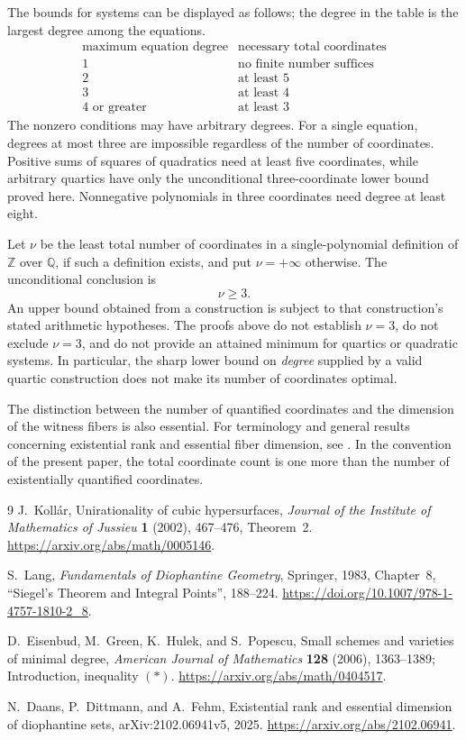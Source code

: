 \documentclass[11pt,a4paper]{article}
\theoremstyle{definition}
\begin{document}
The bounds for systems can be displayed as follows; the degree
in the table is the largest degree among the equations.
\[
\begin{array}{c|c}
\text{maximum equation degree}&\text{necessary total coordinates}\\
\hline
1&\text{no finite number suffices}\\
2&\text{at least }5\\
3&\text{at least }4\\
4\text{ or greater}&\text{at least }3
\end{array}
\]
The nonzero conditions may have arbitrary degrees. For a single
equation, degrees at most three are impossible regardless of the
number of coordinates. Positive sums of squares of quadratics
need at least five coordinates, while arbitrary quartics have
only the unconditional three-coordinate lower bound proved here.
Nonnegative polynomials in three coordinates need degree at
least eight.

Let $\nu$ be the least total number of coordinates in a
single-polynomial definition of $\mathbb Z$ over $\mathbb Q$,
if such a definition exists, and put $\nu=+\infty$ otherwise.
The unconditional conclusion is
\[
                              \nu\ge3.
\]
An upper bound obtained from a construction is subject to that
construction's stated arithmetic hypotheses. The proofs above
do not establish $\nu=3$, do not exclude $\nu=3$, and do not
provide an attained minimum for quartics or quadratic systems.
In particular, the sharp lower bound on \emph{degree} supplied
by a valid quartic construction does not make its number of
coordinates optimal.

The distinction between the number of quantified coordinates
and the dimension of the witness fibers is also essential.
For terminology and general results concerning existential rank
and essential fiber dimension, see \cite{DDF}. In the convention
of the present paper, the total coordinate count is one more
than the number of existentially quantified coordinates.

\begin{thebibliography}{9}
J.~Koll\'ar, Unirationality of cubic hypersurfaces,
\emph{Journal of the Institute of Mathematics of Jussieu}
\textbf{1} (2002), 467--476, Theorem~2.
\url{https://arxiv.org/abs/math/0005146}.

S.~Lang, \emph{Fundamentals of Diophantine Geometry},
Springer, 1983, Chapter~8, ``Siegel's Theorem and Integral Points'',
188--224.
\url{https://doi.org/10.1007/978-1-4757-1810-2_8}.

D.~Eisenbud, M.~Green, K.~Hulek, and S.~Popescu,
Small schemes and varieties of minimal degree,
\emph{American Journal of Mathematics} \textbf{128} (2006),
1363--1389; Introduction, inequality $(*)$.
\url{https://arxiv.org/abs/math/0404517}.

N.~Daans, P.~Dittmann, and A.~Fehm,
Existential rank and essential dimension of diophantine sets,
arXiv:2102.06941v5, 2025.
\url{https://arxiv.org/abs/2102.06941}.
\end{thebibliography}
\end{document}
